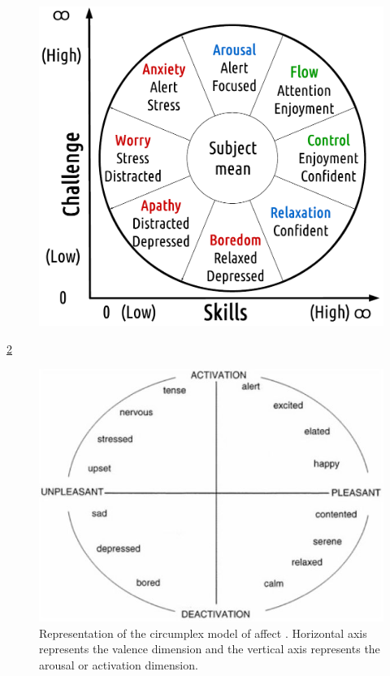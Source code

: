 \begin{figure}[h!]
    \centering
    \includegraphics[scale=0.5]{figures/flow-eight.png}
    \caption{\parencite{nakamura2014concept}}
    \label{fig:flow-eight}
\end{figure}


\ref{fig:av-model}
\textcite{russell1978evidence}
\textcite{posner2005circumplex}

\begin{figure}[h!]
    \centering
    \includegraphics[scale=0.8]{figures/russell-av.png}
    \caption{Representation of the circumplex model of affect \parencite{posner2005circumplex}. Horizontal axis represents the valence dimension and the vertical axis represents the arousal or activation dimension.}
    \label{fig:av-model}
\end{figure}

